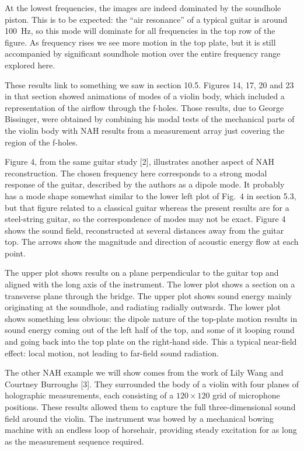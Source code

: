   At the lowest frequencies, the images are indeed dominated by the soundhole 
  piston. This is to be expected: the “air resonance” of a typical guitar is 
  around 100~Hz, so this mode will dominate for all frequencies in the top row 
  of the figure. As frequency rises we see more motion in the top plate, but it 
  is still accompanied by significant soundhole motion over the entire 
  frequency range explored here. 

  These results link to something we saw in section 10.5. Figures 14, 17, 20 
  and 23 in that section showed animations of modes of a violin body, which 
  included a representation of the airflow through the f-holes. Those results, 
  due to George Bissinger, were obtained by combining his modal tests of the 
  mechanical parts of the violin body with NAH results from a measurement array 
  just covering the region of the f-holes. 

  Figure 4, from the same guitar study [2], illustrates another aspect of NAH 
  reconstruction. The chosen frequency here corresponds to a strong modal 
  response of the guitar, described by the authors as a dipole mode. It 
  probably has a mode shape somewhat similar to the lower left plot of Fig.\ 4 
  in section 5.3, but that figure related to a classical guitar whereas the 
  present results are for a steel-string guitar, so the correspondence of modes 
  may not be exact. Figure 4 shows the sound field, reconstructed at several 
  distances away from the guitar top. The arrows show the magnitude and 
  direction of acoustic energy flow at each point. 

  The upper plot shows results on a plane perpendicular to the guitar top and 
  aligned with the long axis of the instrument. The lower plot shows a section 
  on a transverse plane through the bridge. The upper plot shows sound energy 
  mainly originating at the soundhole, and radiating radially outwards. The 
  lower plot shows something less obvious: the dipole nature of the top-plate 
  motion results in sound energy coming out of the left half of the top, and 
  some of it looping round and going back into the top plate on the right-hand 
  side. This a typical near-field effect: local motion, not leading to 
  far-field sound radiation. 

  The other NAH example we will show comes from the work of Lily Wang and 
  Courtney Burroughs [3]. They surrounded the body of a violin with four planes 
  of holographic measurements, each consisting of a $120 \times 120$ grid of 
  microphone positions. These results allowed them to capture the full 
  three-dimensional sound field around the violin. The instrument was bowed by 
  a mechanical bowing machine with an endless loop of horsehair, providing 
  steady excitation for as long as the measurement sequence required. 


